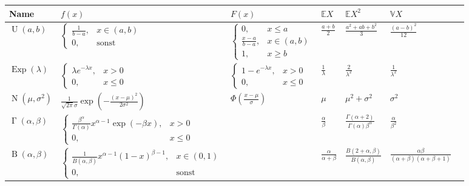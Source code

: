 \documentclass[a4paper]{article}
\theoremstyle{marginbreak}
\DeclareMathOperator{\U}{U}
\DeclareMathOperator{\Exp}{Exp}
\DeclareMathOperator{\Nd}{N}
\DeclareMathOperator{\Gd}{\Gamma}
\DeclareMathOperator{\Bd}{B}
\newcommand{\E}{\mathbb{E}}
\newcommand{\V}{\mathbb{V}}
\begin{document}
	\begin{landscape}
	\begin{table}[H]
		\centering
		\begin{tabular}{ | M{2cm} | M{5.54cm} | M{3.5cm} | M{3.5cm} | M{3.5cm} | M{4cm} | N}
			\hline
			Name & $f(x)$ & $F(x)$ & $\E X$ & $\E X^2$ & $\V X$ & \\[0.6cm] \hline \hline
			$\U(a, b)$ & $\begin{cases}\frac{1}{b-a}, &x\in(a, b)\\0, &\text{sonst}\end{cases}$ &
				$\begin{cases}0,&x\leq a\\\frac{x-a}{b-a}, &x\in(a, b)\\1,&x\geq b\end{cases}$ &
				$\frac{a+b}{2}$ & $\frac{a^2+ab+b^2}{3}$ & $\frac{(a-b)^2}{12}$ & \\[1.8cm] \hline
			$\Exp(\lambda)$ & $\begin{cases}\lambda e^{-\lambda x}, &x>0\\0,&x\leq 0\end{cases}$ &
				$\begin{cases}1-e^{-\lambda x},&x>0\\0,&x\leq 0\end{cases}$ & $\frac{1}{\lambda}$ & $\frac{2}{\lambda^2}$
				& $\frac{1}{\lambda^2}$ & \\[1.2cm] \hline
			$\Nd(\mu, \sigma^2)$ & $\frac{1}{\sqrt{2\pi}\sigma}\exp(-\frac{(x-\mu)^2}{2\sigma^2})$ & $\Phi(\frac{x-\mu}{\sigma})$
				& $\mu$ & $\mu^2+\sigma^2$ & $\sigma^2$ & \\[0.6cm] \hline
			$\Gd(\alpha, \beta)$ & $\begin{cases}\frac{\beta^\alpha}{\Gamma(\alpha)}x^{\alpha - 1}\exp(-\beta x),&x>0\\0,&x\leq 0\end{cases}$
				& & $\frac{\alpha}{\beta}$ & $\frac{\Gamma(\alpha+2)}{\Gamma(\alpha)\beta^\alpha}$ & $\frac{\alpha}{\beta^2}$ &\\[1.2cm] \hline
			$\Bd(\alpha, \beta)$ & $\begin{cases}\frac{1}{B(\alpha,\beta)}x^{\alpha-1}(1-x)^{\beta-1},&x\in(0,1)\\0,&\text{sonst}\end{cases}$
				& & $\frac{\alpha}{\alpha+\beta}$ & $\frac{B(2+\alpha,\beta)}{B(\alpha, \beta)}$
				& $\frac{\alpha\beta}{(\alpha+\beta)(\alpha+\beta+1)}$ & \\[1.2cm] \hline

\end{tabular}
\end{table}
\end{landscape}
\end{document}
